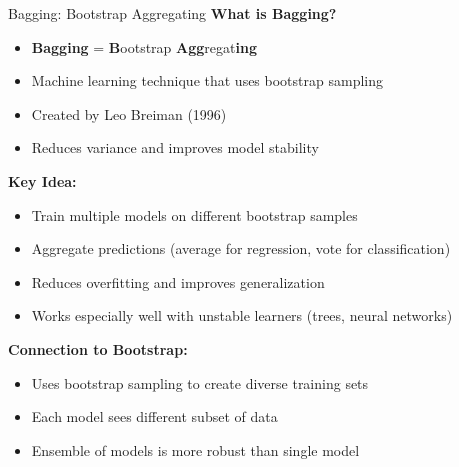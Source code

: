 \documentclass[aspectratio=169]{beamer}
\begin{document}
\begin{frame}{Bagging: Bootstrap Aggregating}
\footnotesize
\textbf{What is Bagging?}
\begin{itemize}
    \item \textbf{Bagging} = \textbf{B}ootstrap \textbf{Agg}regat\textbf{ing}
    \item Machine learning technique that uses bootstrap sampling
    \item Created by Leo Breiman (1996)
    \item Reduces variance and improves model stability
\end{itemize}

\vspace{0.2cm}
\textbf{Key Idea:}
\begin{itemize}
    \item Train multiple models on different bootstrap samples
    \item Aggregate predictions (average for regression, vote for classification)
    \item Reduces overfitting and improves generalization
    \item Works especially well with unstable learners (trees, neural networks)
\end{itemize}

\vspace{0.15cm}
\textbf{Connection to Bootstrap:}
\begin{itemize}
    \item Uses bootstrap sampling to create diverse training sets
    \item Each model sees different subset of data
    \item Ensemble of models is more robust than single model
\end{itemize}
\end{frame}
\end{document}
